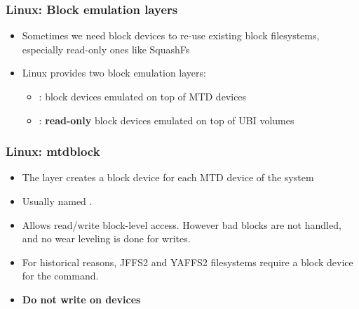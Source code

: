 \begin{frame}
  \frametitle{Linux: Block emulation layers}
  \begin{itemize}
  \item Sometimes we need block devices to re-use existing block
    filesystems, especially read-only ones like SquashFs
  \item Linux provides two block emulation layers:
    \begin{itemize}
    \item {}: block devices emulated on top of MTD devices
    \item {}: {\bf read-only} block devices emulated on top of UBI volumes
    \end{itemize}
  \end{itemize}
\end{frame}

\begin{frame}
  \frametitle{Linux: mtdblock}
  \begin{itemize}
  \item The  layer creates a block device for each MTD
    device of the system
  \item Usually named .
  \item Allows read/write block-level access. However bad blocks are not
    handled, and no wear leveling is done for writes.
  \item For historical reasons, JFFS2 and YAFFS2 filesystems require a
    block device for the  command.
  \item {\bf Do not write on  devices}
  \end{itemize}
\end{frame}

